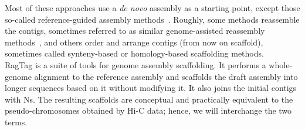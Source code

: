 Most of these approaches use a \textit{de novo} assembly as a starting point, except those so-called reference-guided assembly methods~\cite{ReferenceguidedAssemblyFour,lischerReferenceguidedNovoAssembly2017}. Roughly, some methods reassemble the contigs, sometimes referred to as similar genome-assisted reassembly methods~\cite{baoAlignGraphAlgorithmSecondary2014,huangAlignGraph2SimilarGenomeassisted2021,baoReMILOReferenceAssisted2018}, and others order and arrange contigs (from now on scaffold), sometimes called synteny-based or homology-based scaffolding methods.~\cite{kimReferenceassistedChromosomeAssembly2013,kolmogorovRagout2022,alongeAutomatedAssemblyScaffolding2022}\\

RagTag is a suite of tools for genome assembly scaffolding. It performs a whole-genome alignment to the reference assembly and scaffolds the draft assembly into longer sequences based on it without modifying it. It also joins the initial contigs with Ns. The resulting scaffolds are conceptual and practically equivalent to the pseudo-chromosomes obtained by Hi-C data; hence, we will interchange the two terms. \\